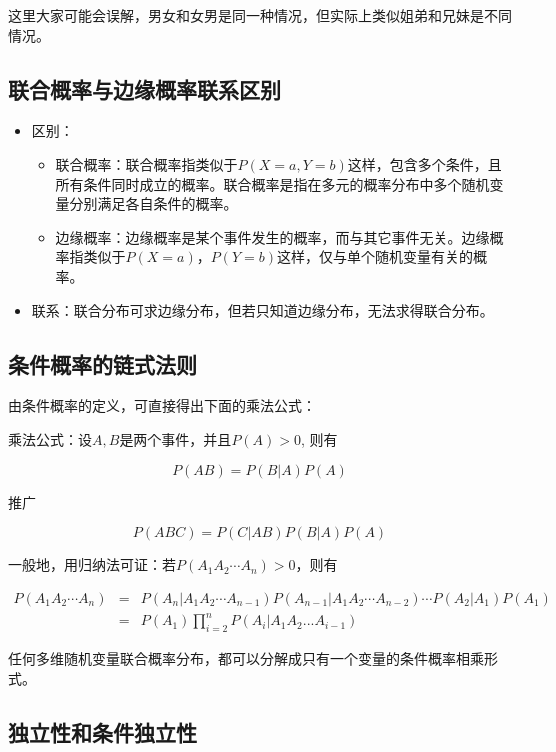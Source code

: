 这里大家可能会误解，男女和女男是同一种情况，但实际上类似姐弟和兄妹是不同情况。 

\subsection{联合概率与边缘概率联系区别}

\begin{itemize}\itemsep0em
\item 区别：
\begin{itemize}\itemsep0em
		\item 联合概率：联合概率指类似于$P(X=a,Y=b)$这样，包含多个条件，且所有条件同时成立的概率。联合概率是指在多元的概率分布中多个随机变量分别满足各自条件的概率。  
		\item 边缘概率：边缘概率是某个事件发生的概率，而与其它事件无关。边缘概率指类似于$P(X=a)$，$P(Y=b)$这样，仅与单个随机变量有关的概率。
\end{itemize}

\item 联系：联合分布可求边缘分布，但若只知道边缘分布，无法求得联合分布。  
\end{itemize}

\subsection{条件概率的链式法则}

由条件概率的定义，可直接得出下面的乘法公式：  

乘法公式：设$A, B$是两个事件，并且$P(A) > 0$, 则有 

$$
P(AB) = P(B|A)P(A)
$$

推广 

$$
P(ABC)=P(C|AB)P(B|A)P(A)
$$

一般地，用归纳法可证：若$P(A_1 A_2\cdots A_n)>0$，则有

\begin{eqnarray*}
	P(A_1 A_2\cdots A_n) &=& P(A_n|A_1 A_2\cdots A_{n-1}) P(A_{n-1}|A_1 A_2\cdots A_{n-2})\cdots P(A_2|A_1)P(A_1) \\
	&=& P(A_1)\prod_{i=2}^{n}P(A_i|A_1A_2...A_{i-1})
\end{eqnarray*}

任何多维随机变量联合概率分布，都可以分解成只有一个变量的条件概率相乘形式。 

\subsection{独立性和条件独立性}

